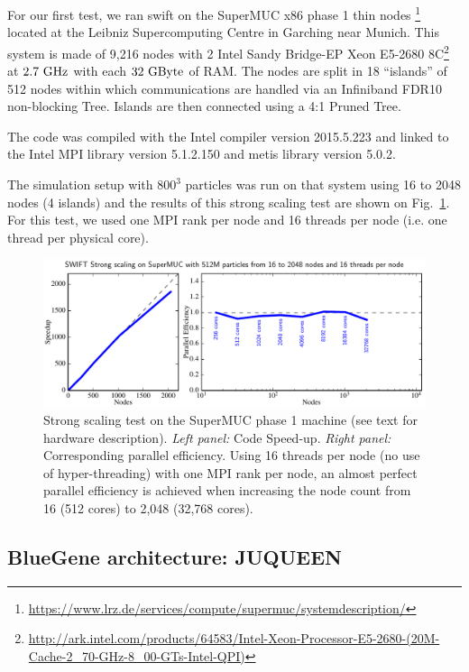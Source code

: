 \documentclass{sig-alternate-05-2015}
\newcommand{\swift}{{\sc swift}\xspace}
\begin{document}
For our first test, we ran \swift on the SuperMUC x86 phase 1 thin
nodes \footnote{\url{https://www.lrz.de/services/compute/supermuc/systemdescription/}}
located at the Leibniz Supercomputing Centre in Garching near Munich. This
system is made of 9,216 nodes with 2 Intel Sandy Bridge-EP Xeon E5-2680
8C\footnote{\url{http://ark.intel.com/products/64583/Intel-Xeon-Processor-E5-2680-(20M-Cache-2_70-GHz-8_00-GTs-Intel-QPI)}}
at $2.7~\rm{GHz}$ with each $32~\rm{GByte}$ of RAM. The nodes are split in 18
``islands'' of 512 nodes within which communications are handled via an
Infiniband FDR10 non-blocking Tree. Islands are then connected using a 4:1
Pruned Tree.

The code was compiled with the Intel compiler version \textsc{2015.5.223} and
linked to the Intel MPI library version \textsc{5.1.2.150} and metis library
version \textsc{5.0.2}.

The simulation setup with $800^3$ particles was run on that system using 16 to
2048 nodes (4 islands) and the results of this strong scaling test are shown on
Fig.~\ref{fig:superMUC}. For this test, we used one MPI rank per node and 16
threads per node (i.e. one thread per physical core).

\begin{figure}[t]
\centering
\includegraphics[width=\textwidth]{Figures/scalingSuperMUC}
\caption{Strong scaling test on the SuperMUC phase 1 machine (see text
  for hardware description). \textit{Left panel:} Code
  Speed-up. \textit{Right panel:} Corresponding parallel efficiency.
  Using 16 threads per node (no use of hyper-threading) with one MPI rank
  per node, an almost perfect parallel efficiency is achieved when
  increasing the node count from 16 (512 cores) to 2,048 (32,768
  cores).
  \label{fig:superMUC}}
\end{figure}


\subsection{BlueGene architecture: JUQUEEN}
\end{document}
